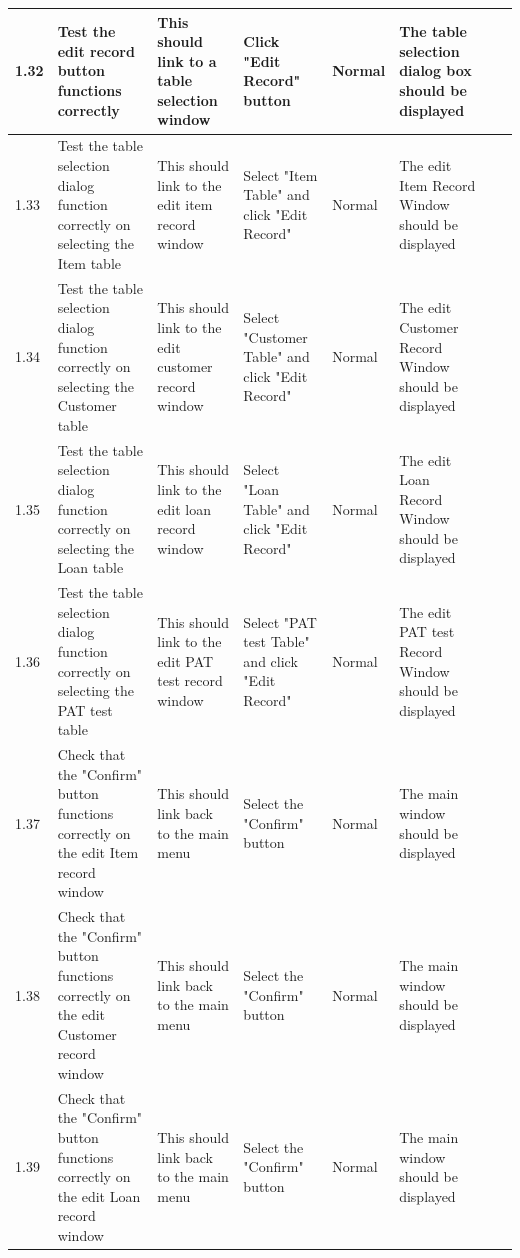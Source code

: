 \begin{landscape}
\begin{center}
\begin{longtable}{|p{1.5cm}|p{2cm}|p{3cm}|p{2cm}|p{2cm}|p{2.5cm}|p{2cm}|p{2cm}|}
        1.32 & Test the edit record button functions correctly & This should link to a table selection window & Click "Edit Record" button & Normal & The table
        selection dialog box should be displayed & & \\ \hline 
        
        1.33 & Test the table selection dialog function correctly on selecting the Item table & This should link to the edit item record window & Select "Item Table" 
        and click "Edit Record" & Normal & The edit Item Record Window should be displayed & & \\ \hline
        
        1.34 & Test the table selection dialog function correctly on selecting the Customer table & This should link to the edit customer record window & Select 
        "Customer Table" and click "Edit Record" & Normal & The edit Customer Record Window should be displayed & & \\ \hline

        1.35 & Test the table selection dialog function correctly on selecting the Loan table & This should link to the edit loan record window & Select "Loan 
        Table" and click "Edit Record" & Normal & The edit Loan Record Window should be displayed & & \\ \hline
        
        1.36 & Test the table selection dialog function correctly on selecting the PAT test table & This should link to the edit PAT test record window & Select "PAT 
        test Table" and click "Edit Record" & Normal & The edit PAT test Record Window should be displayed & & \\ \hline
        
        1.37 & Check that the "Confirm" button functions correctly on the edit Item record window & This should link back to the main menu & Select the "Confirm" 
        button & Normal & The main window should be displayed & & \\ \hline
        
        1.38 & Check that the "Confirm" button functions correctly on the edit Customer record window & This should link back to the main menu & Select the "Confirm" 
        button & Normal & The main window should be displayed & & \\ \hline
        
        1.39 & Check that the "Confirm" button functions correctly on the edit Loan record window & This should link back to the main menu & Select the "Confirm" 
        button & Normal & The main window should be displayed & & \\ \hline
        

\end{longtable}
\end{center}
\end{landscape}
